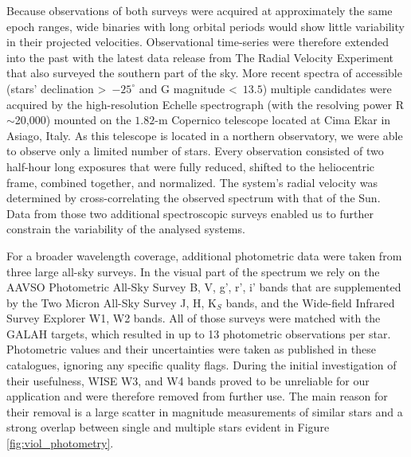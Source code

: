 Because observations of both surveys were acquired at approximately the same epoch ranges, wide binaries with long orbital periods would show little variability in their projected velocities. Observational time-series were therefore extended into the past with the latest data release from The Radial Velocity Experiment \citep[RAVE DR5,][]{2017AJ....153...75K} that also surveyed the southern part of the sky. More recent spectra of accessible (stars' declination >~$-25^{\circ}$ and G magnitude <~$13.5$) multiple candidates were acquired by the high-resolution Echelle spectrograph (with the resolving power R $\sim$20,000) mounted on the $1.82$-m Copernico telescope located at Cima Ekar in Asiago, Italy. As this telescope is located in a northern observatory, we were able to observe only a limited number of stars. Every observation consisted of two half-hour long exposures that were fully reduced, shifted to the heliocentric frame, combined together, and normalized. The system's radial velocity was determined by cross-correlating the observed spectrum with that of the Sun. Data from those two additional spectroscopic surveys enabled us to further constrain the variability of the analysed systems.

For a broader wavelength coverage, additional photometric data were taken from three large all-sky surveys. In the visual part of the spectrum we rely on the AAVSO Photometric All-Sky Survey \citep[APASS,][]{2015AAS...22533616H} B, V, g', r', i' bands that are supplemented by the Two Micron All-Sky Survey \citep[2MASS,][]{2006AJ....131.1163S} J, H, K$_S$ bands, and the Wide-field Infrared Survey Explorer \citep[WISE,][]{2010AJ....140.1868W} W1, W2 bands. All of those surveys were matched with the GALAH targets, which resulted in up to 13 photometric observations per star. Photometric values and their uncertainties were taken as published in these catalogues, ignoring any specific quality flags. During the initial investigation of their usefulness, WISE W3, and W4 bands proved to be unreliable for our application and were therefore removed from further use. The main reason for their removal is a large scatter in magnitude measurements of similar stars and a strong overlap between single and multiple stars evident in Figure \ref{fig:viol_photometry}.

